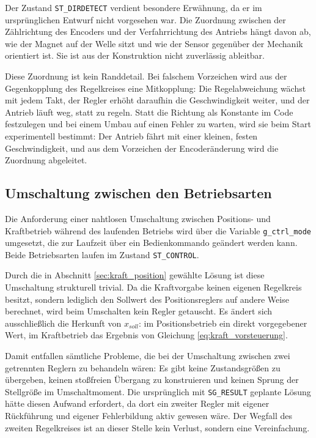 Der Zustand \texttt{ST\_DIRDETECT} verdient besondere Erwähnung, da er im ursprünglichen
Entwurf nicht vorgesehen war. Die Zuordnung zwischen der Zählrichtung des Encoders und
der Verfahrrichtung des Antriebs hängt davon ab, wie der Magnet auf der Welle sitzt und
wie der Sensor gegenüber der Mechanik orientiert ist. Sie ist aus der Konstruktion nicht
zuverlässig ableitbar.

Diese Zuordnung ist kein Randdetail. Bei falschem Vorzeichen wird aus der Gegenkopplung
des Regelkreises eine Mitkopplung: Die Regelabweichung wächst mit jedem Takt, der Regler
erhöht daraufhin die Geschwindigkeit weiter, und der Antrieb läuft weg, statt zu regeln.
Statt die Richtung als Konstante im Code festzulegen und bei einem Umbau auf einen Fehler
zu warten, wird sie beim Start experimentell bestimmt: Der Antrieb fährt mit einer kleinen,
festen Geschwindigkeit, und aus dem Vorzeichen der Encoderänderung wird die Zuordnung
abgeleitet.

\subsection*{Umschaltung zwischen den Betriebsarten}

Die Anforderung einer nahtlosen Umschaltung zwischen Positions- und Kraftbetrieb während
des laufenden Betriebs wird über die Variable \texttt{g\_ctrl\_mode} umgesetzt, die zur
Laufzeit über ein Bedienkommando geändert werden kann. Beide Betriebsarten laufen im
Zustand \texttt{ST\_CONTROL}.

Durch die in Abschnitt \ref{sec:kraft_position} gewählte Lösung ist diese Umschaltung
strukturell trivial. Da die Kraftvorgabe keinen eigenen Regelkreis besitzt, sondern
lediglich den Sollwert des Positionsreglers auf andere Weise berechnet, wird beim
Umschalten kein Regler getauscht. Es ändert sich ausschließlich die Herkunft von
$x_{soll}$: im Positionsbetrieb ein direkt vorgegebener Wert, im Kraftbetrieb das Ergebnis
von Gleichung \ref{eq:kraft_vorsteuerung}.

Damit entfallen sämtliche Probleme, die bei der Umschaltung zwischen zwei getrennten
Reglern zu behandeln wären: Es gibt keine Zustandsgrößen zu übergeben, keinen
stoßfreien Übergang zu konstruieren und keinen Sprung der Stellgröße im Umschaltmoment.
Die ursprünglich mit \texttt{SG\_RESULT} geplante Lösung hätte diesen Aufwand erfordert,
da dort ein zweiter Regler mit eigener Rückführung und eigener Fehlerbildung aktiv gewesen
wäre. Der Wegfall des zweiten Regelkreises ist an dieser Stelle kein Verlust, sondern eine
Vereinfachung.

